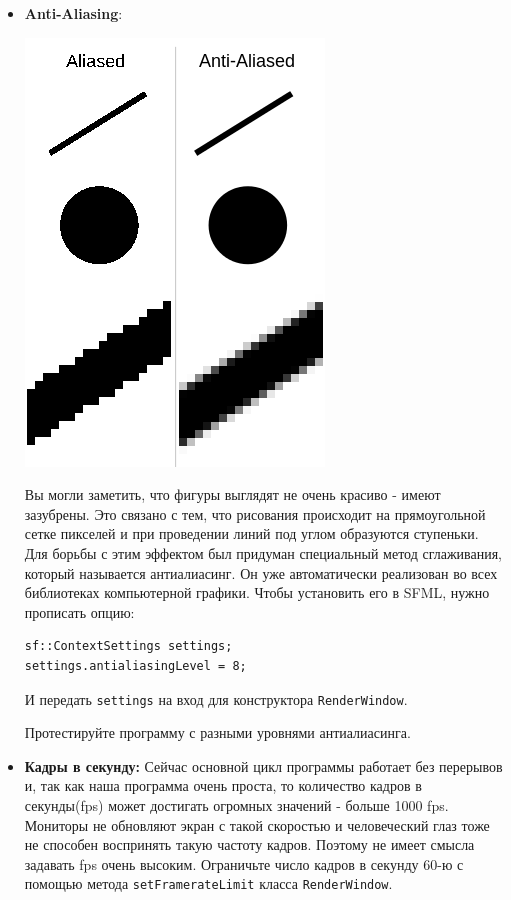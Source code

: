 \documentclass{article}
\begin{document}
\begin{itemize}
\item \textbf{Anti-Aliasing}:
\begin{multicols}{2}
\begin{center}
\includegraphics[scale=0.5]{../images/anti-aliasing.png}
\end{center}
Вы могли заметить, что фигуры выглядят не очень красиво - имеют зазубрены. Это связано с тем, что рисования происходит на прямоугольной сетке пикселей и при проведении линий под углом образуются ступеньки. Для борьбы с этим эффектом был придуман специальный метод сглаживания, который называется антиалиасинг. Он уже автоматически реализован во всех библиотеках компьютерной графики. Чтобы установить его в SFML, нужно прописать опцию:
\begin{lstlisting}
sf::ContextSettings settings;
settings.antialiasingLevel = 8;
\end{lstlisting}
И передать \texttt{settings} на вход для конструктора \texttt{RenderWindow}.
\end{multicols}
Протестируйте программу с разными уровнями антиалиасинга.

\item \textbf{Кадры в секунду:} Сейчас основной цикл программы работает без перерывов и, так как наша программа очень проста, то количество кадров в секунды(fps) может достигать огромных значений - больше 1000 fps. Мониторы не обновляют экран с такой скоростью и человеческий глаз тоже не способен воспринять такую частоту кадров. Поэтому не имеет смысла задавать fps очень высоким. Ограничьте число кадров в секунду 60-ю с помощью метода \texttt{setFramerateLimit} класса \texttt{RenderWindow}.


\end{itemize}
\end{document}
